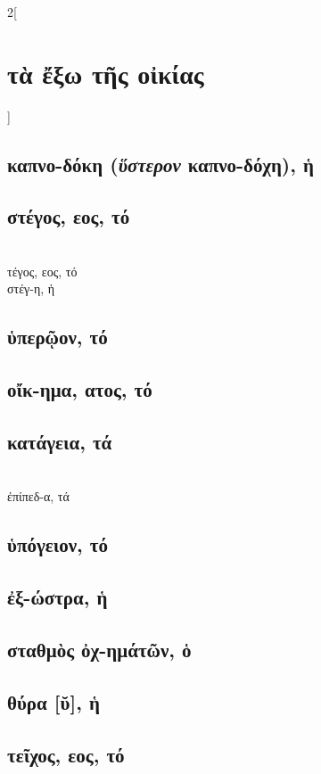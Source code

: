 \documentclass{book}
\begin{document}
\newpage  
\begin{multicols}{2}[\section{τὰ ἔξω τῆς οἰκίας}]
{\renewcommand \thesubsection {\thesection} }
\subsection{καπνο-δόκη (\textit{ὕστερον} καπνο-δόχη), ἡ}
\subsection{στέγος, εος, τό}
 ~\\
τέγος, εος, τό  ~\\
στέγ-η, ἡ 
\subsection{ὑπερῷον, τό}
\subsection{οἴκ-ημα, ατος, τό}
\subsection{κατάγεια, τά}
 ~\\
ἐπίπεδ-α, τά 
\subsection{ὑπόγειον, τό}
\subsection{ἐξ-ώστρα, ἡ}
\subsection{σταθμὸς ὀχ-ημάτῶν, ὁ}
\subsection{θύρα [ῠ], ἡ}
\subsection{τεῖχος, εος, τό}

\end{multicols}
\end{document}
